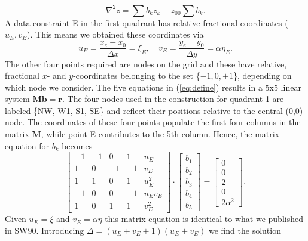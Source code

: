 \documentclass[12pt,letterpaper,margin=0.5in]{article}
\begin{document}
\begin{equation}
	\nabla^2 z = \sum b_k z_k - z_{00}\sum b_k.
\end{equation}
A data constraint E in the first quadrant has relative fractional coordinates ($u_E, v_E$).  This means
we obtained these coordinates via
\begin{equation}
	u_E = \frac{x_e - x_0}{\Delta x} = \xi_E, \quad v_E = \frac{y_e - y_0}{\Delta y} = \alpha \eta_E.
\end{equation}
The other four points required are
nodes on the grid and these have relative, fractional $x$- and $y$-coordinates belonging to the set \{$-1, 0, +1$\},
depending on which node we consider. The five equations in (\ref{eq:define}) results in a 5x5 linear system $\mathbf{Mb} = \mathbf{r}$.
The four nodes used in the construction for quadrant 1 are labeled \{NW, W1, S1, SE\}
and reflect their positions relative to the central (0,0) node.
The coordinates of these four points populate the first four columns in the matrix $\mathbf{M}$, while point E
contributes to the 5th column. Hence, the matrix equation
for $b_k$ becomes
\begin{equation}
\left[ {\begin{array}{*{20}{r}}
{ - 1}&{ - 1}&0&1&{{u_E}}\\
1&0&{ - 1}&{ - 1}&{{v_E}}\\
1&1&0&1&{u_E^2}\\
{ - 1}&0&0&{ - 1}&{{u_E}{v_E}}\\
1&0&1&1&{v_E^2}
\end{array}} \right] \cdot \left[ {\begin{array}{*{20}{c}}
{{b_1}}\\
{{b_2}}\\
{{b_3}}\\
{{b_4}}\\
{{b_5}}
\end{array}} \right] = \left[ {\begin{array}{*{20}{c}}
0\\
0\\
2\\
0\\
2\alpha^2
\end{array}} \right].
\end{equation}
Given $u_E = \xi$ and $v_E = \alpha \eta$ this matrix equation is identical to what we published in SW90. 
Introducing $\Delta = \left (u_E + v_E + 1 \right)\left (u_E + v_E\right)$ we find
the solution
\end{document}
